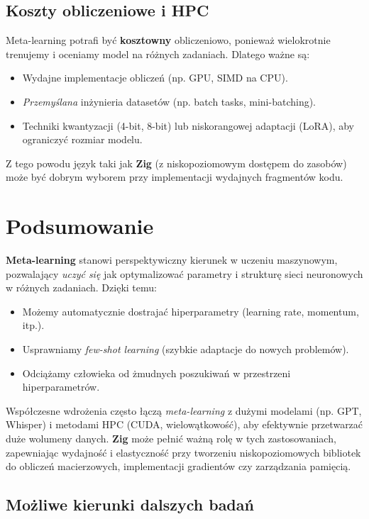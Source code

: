 \documentclass[12pt,a4paper]{article}
\begin{document}
\subsection{Koszty obliczeniowe i HPC}

Meta-learning potrafi być \textbf{kosztowny} obliczeniowo, ponieważ wielokrotnie trenujemy i oceniamy model na różnych zadaniach. Dlatego ważne są:
\begin{itemize}
    \item Wydajne implementacje obliczeń (np. GPU, SIMD na CPU).
    \item \emph{Przemyślana} inżynieria datasetów (np. batch tasks, mini-batching).
    \item Techniki kwantyzacji (4-bit, 8-bit) lub niskorangowej adaptacji (LoRA), aby ograniczyć rozmiar modelu.
\end{itemize}

Z tego powodu język taki jak \textbf{Zig} (z niskopoziomowym dostępem do zasobów) może być dobrym wyborem przy implementacji wydajnych fragmentów kodu.

\section{Podsumowanie}

\textbf{Meta-learning} stanowi perspektywiczny kierunek w uczeniu maszynowym, pozwalający \emph{uczyć się} jak optymalizować parametry i strukturę sieci neuronowych w różnych zadaniach. Dzięki temu:
\begin{itemize}
    \item Możemy automatycznie dostrajać hiperparametry (learning rate, momentum, itp.).
    \item Usprawniamy \emph{few-shot learning} (szybkie adaptacje do nowych problemów).
    \item Odciążamy człowieka od żmudnych poszukiwań w przestrzeni hiperparametrów.
\end{itemize}

Współczesne wdrożenia często łączą \emph{meta-learning} z dużymi modelami (np. GPT, Whisper) i metodami HPC (CUDA, wielowątkowość), aby efektywnie przetwarzać duże wolumeny danych. \textbf{Zig} może pełnić ważną rolę w tych zastosowaniach, zapewniając wydajność i elastyczność przy tworzeniu niskopoziomowych bibliotek do obliczeń macierzowych, implementacji gradientów czy zarządzania pamięcią.

\subsection*{Możliwe kierunki dalszych badań}
\end{document}
